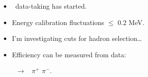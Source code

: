 


 

\begin{slide*}

\slideframe{}
\huge
{}

\begin{minipage}[t]{\linewidth}
\LARGE

\begin{itemize}

  \item \yss\ data-taking has started.

  \item Energy calibration fluctuations $\le$ 0.2 MeV.

  \item I'm investigating cuts for hadron selection\ldots

  \item Efficiency can be measured from data:
        \begin{center} \ysss\ $\rightarrow$ \ys\ $\pi^+$ $\pi^-$. \end{center}

\end{itemize}

\end{minipage}

\end{slide*}

